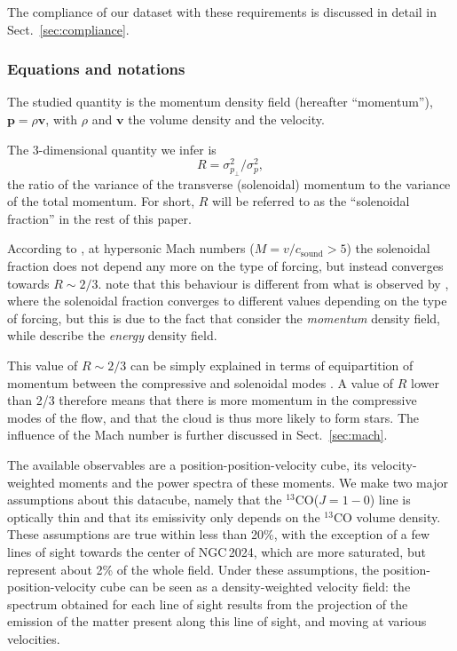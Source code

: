 \documentclass[structabstract]{aa}
\newcommand{\eg}{{\em e.g.,}}
\newcommand{\emm}[1]{\ensuremath{#1}}
\newcommand{\emr}[1]{\emm{\mathrm{#1}}}
\begin{document}
The compliance of our dataset with these requirements is discussed in detail in Sect.~\ref{sec:compliance}.

\subsubsection{Equations and notations}

The studied quantity is the momentum density field (hereafter ``momentum''), $\mathbf{p} = \rho \mathbf{v}$, with $\rho$ and $\mathbf{v}$ the volume density and the velocity.

The 3-dimensional quantity we infer is
\begin{equation}
R = \sigma_{p_\perp}^2 / \sigma_p^2,
\end{equation}
the ratio of the variance of the transverse (solenoidal) momentum to the variance of the total momentum. For short, $R$ will be referred to as the ``solenoidal fraction'' in the rest of this paper.

According to \citet{brunt14}, at hypersonic Mach numbers ($M = v/c_{\emr{sound}} > 5$) the solenoidal fraction does not depend any more on the type of forcing, but instead converges towards $R \sim 2/3$. \citet{brunt14} note that this behaviour is different from what is observed by \citet{federrath11}, where the solenoidal fraction converges to different values depending on the type of forcing, but this is due to the fact that \citet{brunt14} consider the \emph{momentum} density field, while \citet{federrath11} describe the \emph{energy} density field.

This value of $R \sim 2/3$ can be simply explained in terms of equipartition of momentum between the compressive and solenoidal modes \citep[see, \eg{}][]{federrath08}. A value of $R$ lower than 2/3 therefore means that there is more momentum in the compressive modes of the flow, and that the cloud is thus more likely to form stars. The influence of the Mach number is further discussed in Sect.~\ref{sec:mach}.

The available observables are a position-position-velocity  cube, its velocity-weighted moments and the power spectra of these moments. We make two major assumptions about this datacube, namely that the $^{13}$CO($J=1-0$) line is optically thin and that its emissivity only depends on the $^{13}$CO volume density. These assumptions are true within less than 20\%, with the exception of a few lines of sight towards the center of NGC\,2024, which are more saturated, but represent about 2\% of the whole field. Under these assumptions, the position-position-velocity cube can be seen as a density-weighted velocity field: the spectrum obtained for each line of sight results from the projection of the emission of the matter present along this line of sight, and moving at various velocities. 
\end{document}
